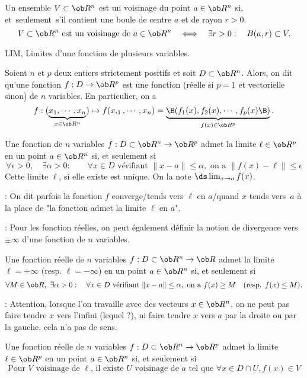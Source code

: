 \Definition []  Un ensemble $V\subset\ob R^n$ est un voisinage du point $a\in\ob R^n$ si, et~seulement~s'il contient une boule de centre $a$ et de rayon $r>0$. 
$$
V\subset\ob R^n\mbox{ est un voisinage de }a\in\ob R^n\quad\Longleftrightarrow\quad\exists r>0:\quad \sc B(a,r)\subset V.
$$


\Subsection LIM, Limites d'une fonction de plusieurs variables. 


\Definition []  Soient $n$ et $p$ deux entiers strictement positifs et soit $D\subset\ob R^n$. Alors, on dit qu'une fonction 
$f:D\to\ob R^p$ est une fonction (réelle si $p=1$ et vectorielle sinon) de $n$ variables. En particulier, on a 
$$
f:(\underbrace{x_1,\cdots, x_n}_{x\in\ob R^n})\mapsto f(x,_1,\cdots, x_n)=\underbrace{\B(f_1(x),f_2(x),\cdots,f_p(x)\B)}_{f(x)\in\ob R^p}.
$$ 
\bigskip


\Definition []  Une fonction de $n$ variables $f:D\subset\ob R^n\to \ob R^p$ admet la limite $\ell\in\ob R^p$ en un point $a\in\ob R^n$ si, et seulement si 
$$
\forall \epsilon> 0, \quad \exists \alpha>0:\qquad \forall x\in D\mbox{ vérifiant } \|x-a\|\le \alpha, \mbox{ on a }\|f(x)-\ell\|\le\epsilon 
$$
Cette limite $\ell$, si elle existe est unique. On la note $\ds\lim_{x\to a}f(x)$. 
\bigskip

\Remarque : On dit parfois la fonction $f$ converge/tends vers $\ell$ en $a$/quand $x$ tends vers~$a$ à la place de "la fonction admet la limite $\ell$ en $a$". 
\bigskip


\Remarque : Pour les fonction réelles, on peut également définir la notion de divergence vers $\pm\infty$ d'une fonction de $n$ variables. 
\bigskip

\Definition []  Une fonction réelle de $n$ variables $f:D\subset\ob R^n\to \ob R$ admet la limite $\ell=+\infty$ (resp. $\ell=-\infty$) en un point $a\in\ob R^n$ si, et seulement si 
$$
\forall M\in\ob R, \ \exists \alpha>0:\quad \forall x\in D\mbox{ vérifiant } \|x-a\|\le \alpha, \mbox{ on a } f(x)\ge M\quad(\mbox{resp. }f(x)\le M).
$$

\Remarque : Attention, lorsque l'on travaille avec des vecteurs $x\in\ob R^n$, on ne peut pas faire tendre $x$ vers l'infini (lequel ?), ni faire tendre $x$ vers $a$ par la droite ou par la gauche, cela n'a pas de sens. 
\bigskip


\Propriete []  Une fonction réelle de $n$ variables $f:D\subset\ob R^n\to \ob R^p$ admet la limite $\ell\in\ob R^p$ en un point $a\in\ob R^n$ si, et seulement si 
$$
{
\mbox{Pour $V$ voisinage de $\ell$, il existe $U$ voisinage de $a$ tel que }\forall x\in D\cap U, f(x)\in V}
$$


